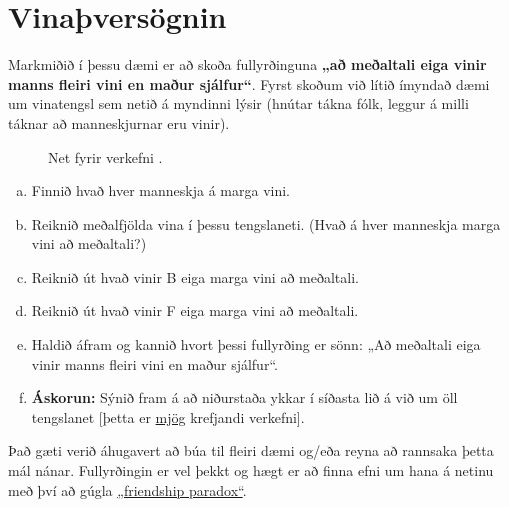 \documentclass[b5paper,12pt]{book}
\renewcommand*\thesection{\arabic{section}}
\begin{document}
\section{Vinaþversögnin}
\label{sec:vina}
Markmiðið í þessu dæmi er að skoða fullyrðinguna \textbf{„að meðaltali eiga vinir manns fleiri vini en maður sjálfur“}. Fyrst skoðum við lítið ímyndað dæmi um vinatengsl sem netið á myndinni lýsir (hnútar tákna fólk, leggur á milli táknar að manneskjurnar eru vinir). 
\begin{figure}[h!]
\centering
{}
\caption*{Net fyrir verkefni \thesection{}.}
\end{figure}
\begin{enumerate}[(a)]
    \item Finnið hvað hver manneskja á marga vini.
    \item Reiknið meðalfjölda vina í þessu tengslaneti. (Hvað á hver manneskja marga vini að meðaltali?)
    \item Reiknið út hvað vinir B eiga marga vini að meðaltali. 
    \item Reiknið út hvað vinir F eiga marga vini að meðaltali. 
    \item Haldið áfram og kannið hvort þessi fullyrðing er sönn: „Að meðaltali eiga vinir manns fleiri vini en maður sjálfur“.
    \item \textbf{Áskorun:} Sýnið fram á að niðurstaða ykkar í síðasta lið á við um öll tengslanet [þetta er \underline{mjög} krefjandi verkefni]. 
\end{enumerate}
Það gæti verið áhugavert að búa til fleiri dæmi og/eða reyna að rannsaka þetta mál nánar. Fullyrðingin er vel þekkt og hægt er að finna efni um hana á netinu með því að gúgla
\href {http://www.google.com/search?q="friendship paradox"}{„friendship paradox“}.
\end{document}
